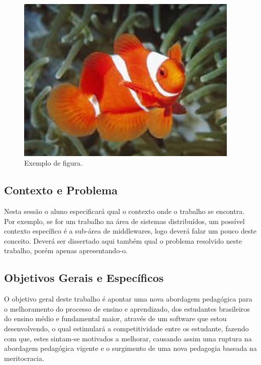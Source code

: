\documentclass[
	article,			%
	11pt,				%
	oneside,			%
	a4paper,			%
	english,			%
	brazil,				%
	sumario=tradicional
	]{abntex2}
\begin{document}
\begin{figure} [hbt] 
	\label{figura1} 
	\caption{Exemplo de figura.}
	\includegraphics[width=0.95\textwidth]{nemo.jpeg} %
\end{figure}



\subsection{Contexto e Problema}

Nesta sessão o aluno especificará qual o contexto onde o trabalho se encontra. Por exemplo, se for um trabalho na área de sistemas distribuídos, um possível contexto específico é a sub-área de middlewares, logo deverá falar um pouco deste conceito. 
Deverá ser dissertado aqui também qual o problema resolvido neste trabalho, porém apenas apresentando-o.


\subsection{Objetivos Gerais e Específicos}

O objetivo geral deste trabalho é apontar uma nova abordagem pedagógica para o melhoramento do processo de ensino e aprendizado, dos estudantes brasileiros do ensino médio e fundamental maior, através de um software que estou desenvolvendo, o qual  estimulará a competitividade entre os estudante, fazendo com que, estes sintam-se motivados a melhorar, causando assim uma ruptura na abordagem pedagógica vigente e o surgimento de uma nova pedagogia baseada na meritocracia. 
\end{document}

